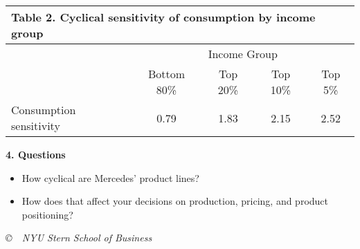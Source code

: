 \documentclass[letterpaper,12pt]{article}
\begin{document}
\begin{center}
\tabcolsep=0.1in
\begin{tabular}{lcccc}
\multicolumn{5}{l}{Table 2.  Cyclical sensitivity of consumption by income group} \\
\toprule
    &  \multicolumn{4}{c}{Income Group} \\
        \cmidrule(r){2-5}
    &  Bottom 80\%  &  Top 20\% & Top 10\%  &  Top 5\%  \\
\midrule
Consumption sensitivity &  0.79 & 1.83 & 2.15 & 2.52 \\
\bottomrule
\end{tabular}
\end{center}

{\bf 4. Questions\/}

\begin{itemize}
\item How cyclical are Mercedes' product lines?

\item How does that affect your decisions on production,
pricing, and product positioning?
\end{itemize}

\vfill \centerline{\it \copyright \ \number\year \ NYU Stern
School of Business}
\end{document}
